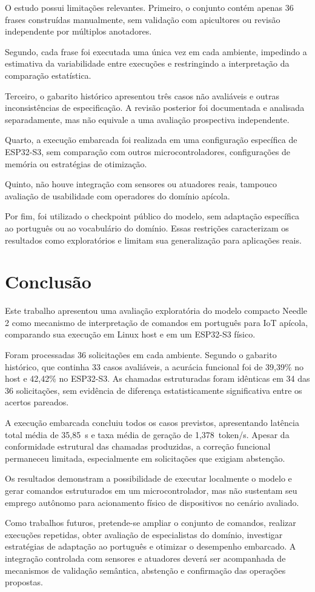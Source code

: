 \documentclass[12pt]{article}
\begin{document}
O estudo possui limitações relevantes.
Primeiro, o conjunto contém apenas 36
frases construídas manualmente, sem
validação com apicultores ou revisão
independente por múltiplos anotadores.

Segundo, cada frase foi executada uma
única vez em cada ambiente, impedindo
a estimativa da variabilidade entre
execuções e restringindo a interpretação
da comparação estatística.

Terceiro, o gabarito histórico apresentou
três casos não avaliáveis e outras
inconsistências de especificação. A
revisão posterior foi documentada e
analisada separadamente, mas não equivale
a uma avaliação prospectiva independente.

Quarto, a execução embarcada foi realizada
em uma configuração específica de
ESP32-S3, sem comparação com outros
microcontroladores, configurações de
memória ou estratégias de otimização.

Quinto, não houve integração com sensores
ou atuadores reais, tampouco avaliação
de usabilidade com operadores do
domínio apícola.

Por fim, foi utilizado o checkpoint
público do modelo, sem adaptação
específica ao português ou ao
vocabulário do domínio. Essas
restrições caracterizam os resultados
como exploratórios e limitam sua
generalização para aplicações reais.

\section{Conclusão}
\label{sec:conclusao}

Este trabalho apresentou uma avaliação
exploratória do modelo compacto Needle 2
como mecanismo de interpretação de
comandos em português para IoT apícola,
comparando sua execução em Linux host
e em um ESP32-S3 físico.

Foram processadas 36 solicitações em
cada ambiente. Segundo o gabarito
histórico, que continha 33 casos
avaliáveis, a acurácia funcional foi
de 39,39\% no host e 42,42\% no
ESP32-S3. As chamadas estruturadas
foram idênticas em 34 das 36
solicitações, sem evidência de
diferença estatisticamente
significativa entre os acertos
pareados.

A execução embarcada concluiu todos
os casos previstos, apresentando
latência total média de 35,85~s e
taxa média de geração de
1,378~token/s. Apesar da conformidade
estrutural das chamadas produzidas,
a correção funcional permaneceu
limitada, especialmente em
solicitações que exigiam abstenção.

Os resultados demonstram a
possibilidade de executar localmente
o modelo e gerar comandos estruturados
em um microcontrolador, mas não
sustentam seu emprego autônomo
para acionamento físico de
dispositivos no cenário avaliado.

Como trabalhos futuros, pretende-se
ampliar o conjunto de comandos,
realizar execuções repetidas,
obter avaliação de especialistas
do domínio, investigar estratégias
de adaptação ao português e
otimizar o desempenho embarcado.
A integração controlada com
sensores e atuadores deverá
ser acompanhada de mecanismos
de validação semântica,
abstenção e confirmação
das operações propostas.



\end{document}
